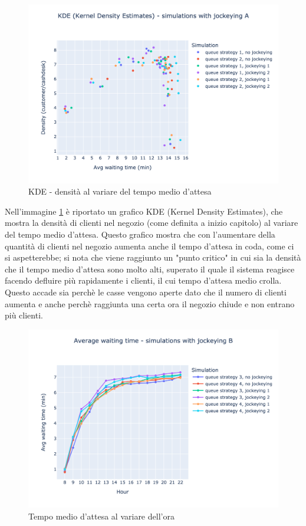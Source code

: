\begin{figure}[H]
	\centering
	\includegraphics[width=12cm]{"images/results/kde_jockey_a.png"}
	
	\caption{KDE - densità al variare del tempo medio d'attesa}
	\label{fig:kde_jockey_a}
\end{figure}

Nell'immagine \ref{fig:kde_jockey_a} è riportato un grafico KDE (Kernel Density Estimates), che mostra la densità di clienti nel negozio (come definita a inizio capitolo) al variare del tempo medio d'attesa. Questo grafico mostra che con l'aumentare della quantità di clienti nel negozio aumenta anche il tempo d'attesa in coda, come ci si aspetterebbe; si nota che viene raggiunto un "punto critico" in cui sia la densità che il tempo medio d'attesa sono molto alti, superato il quale il sistema reagisce facendo defluire più rapidamente i clienti, il cui tempo d'attesa medio crolla. Questo accade sia perchè le casse vengono aperte dato che il numero di clienti aumenta e anche perchè raggiunta una certa ora il negozio chiude e non entrano più clienti.

\begin{figure}[H]
	\centering
	\includegraphics[width=12cm]{"images/results/avg_wt_jockey_b.png"}
	\caption{Tempo medio d'attesa al variare dell'ora}
	\label{fig:avg_wt_jockey_b}
\end{figure}

